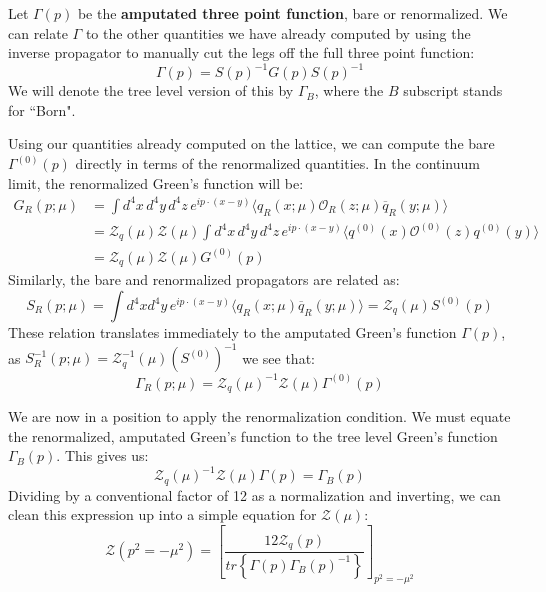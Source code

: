 \documentclass[11pt, oneside]{article}   	%
\theoremstyle{definition}
\begin{document}
Let $\Gamma(p)$ be the \textbf{amputated three point function}, bare or renormalized. We can relate $\Gamma$ to the other 
quantities we have already computed by using the inverse propagator to manually cut the legs off the full three 
point function:
\begin{equation}
	\Gamma(p) = S(p)^{-1} G(p) S(p)^{-1}
\end{equation}
We will denote the tree level version of this by $\Gamma_B$, where the $B$ subscript stands for ``Born". 

Using our quantities already computed on the lattice, we can compute the bare $\Gamma^{(0)}(p)$ directly in terms 
of the renormalized quantities. In the continuum limit, the renormalized Green's function will be:
\begin{align}
	G_R(p; \mu) &= \int d^4x \, d^4 y\, d^4 z\, e^{ip\cdot (x - y)} \langle q_R(x; \mu) \mathcal O_R(z; \mu) \overline 
	q_R(y; \mu) 
	\rangle \\
	&= \mathcal Z_q(\mu) \mathcal Z(\mu) \int d^4x \, d^4 y\, d^4 z\, e^{ip\cdot (x - y)} \langle q^{(0)}(x) \mathcal O^{(0)}
	(z) q^{(0)}(y) \rangle \\
	&= \mathcal Z_q(\mu) \mathcal Z(\mu) G^{(0)}(p)
\end{align}
Similarly, the bare and renormalized propagators are related as:
\begin{equation}
	S_R(p; \mu) = \int d^4x d^4 y\, e^{ip\cdot(x - y)}\langle q_R(x; \mu)\overline q_R(y; \mu)\rangle = \mathcal Z_q(\mu) 
	S^{(0)}(p)
\end{equation}
These relation translates immediately to the amputated Green's function $\Gamma(p)$, as $S^{-1}_R(p; \mu) = \mathcal 
Z_q^{-1}(\mu) (S^{(0)})^{-1}$ we see that:
\begin{equation}
	\Gamma_R(p; \mu) = \mathcal Z_q(\mu)^{-1}\mathcal Z(\mu) \Gamma^{(0)}(p)
\end{equation}

We are now in a position to apply the renormalization condition. We must equate the renormalized, amputated Green's function 
to the tree level Green's function $\Gamma_B(p)$. This gives us:
\begin{equation}
	\mathcal Z_q(\mu)^{-1}\mathcal Z(\mu) \Gamma(p) = \Gamma_B(p)
\end{equation}
Dividing by a conventional factor of 12 as a normalization and inverting, we can clean this expression up into a simple equation 
for $\mathcal Z(\mu)$:
\begin{equation}
	\mathcal Z(p^2 = -\mu^2) = \left[\frac{12\mathcal Z_q(p)}{tr\left\{\Gamma(p)\Gamma_B(p)^{-1}\right\}}\right]_{p^2 
	= -\mu^2}
\end{equation}
\end{document}
